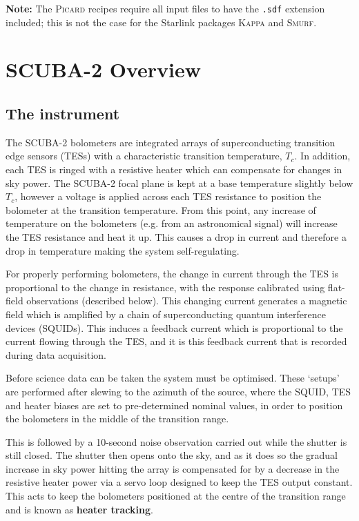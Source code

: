 \documentclass[twoside,11pt]{article}
\newcommand{\xlabel}[1]{}
\renewcommand{\_}{\texttt{\symbol{95}}}
\begin{document}
\textbf{Note:} The \textsc{Picard} recipes require all input files to have
the \texttt{.sdf} extension included; this is not the case for the
Starlink packages \textsc{Kappa} and \textsc{Smurf}.

\clearpage
\section{\xlabel{scuba2_overview}SCUBA-2 Overview}
\subsection{\xlabel{scuba2}The instrument}
\label{sec:s2}

The SCUBA-2 bolometers are integrated arrays of superconducting
transition edge sensors (TESs) with a characteristic transition
temperature, $T_c$. In addition, each TES is ringed with a resistive
heater which can compensate for changes in sky power. The SCUBA-2
focal plane is kept at a base temperature slightly below $T_c$,
however a voltage is applied across each TES resistance to position
the bolometer at the transition temperature.  From this point, any
increase of temperature on the bolometers (e.g. from an astronomical
signal) will increase the TES resistance and heat it up. This causes a
drop in current and therefore a drop in temperature making the system
self-regulating.

For properly performing bolometers, the change in current through the
TES is proportional to the change in resistance, with the response
calibrated using flat-field observations (described below). This
changing current generates a magnetic field which is amplified by a
chain of superconducting quantum interference devices (SQUIDs). This
induces a feedback current which is proportional to the current
flowing through the TES, and it is this feedback current that is
recorded during data acquisition.

Before science data can be taken the system must be optimised. These
`setups' are performed after slewing to the azimuth of the source,
where the SQUID, TES and heater biases are set to pre-determined
nominal values, in order to position the bolometers in the middle of
the transition range.

This is followed by a 10-second noise observation carried out while
the shutter is still closed. The shutter then opens onto the sky, and
as it does so the gradual increase in sky power hitting the array is
compensated for by a decrease in the resistive heater power via a
servo loop designed to keep the TES output constant. This acts to keep
the bolometers positioned at the centre of the transition range and is
known as \textbf{heater tracking}.
\end{document}
